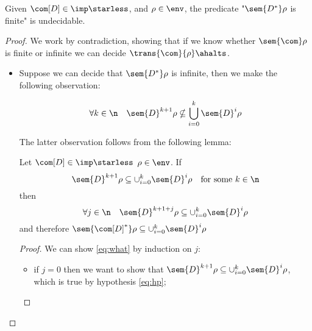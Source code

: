\begin{lemma}\label{le:infiniteness}
  Given \(\com[D]\in\imp\starless\), and \(\rho \in \env\), the
  predicate "\(\sem{D^*}\rho\) is finite" is undecidable.
\end{lemma}

\begin{proof}
  We work by contradiction, showing that if we know whether
  \(\sem{\com}\rho\) is finite or infinite we can decide
  \(\trans{\com}{\rho}\ahalts\).
  \begin{itemize}
  \item Suppose we can decide that \(\sem{D^*}\rho\) is infinite, then
    we make the following observation:
    \begin{observation}\label{obs:noncontained}
      \begin{equation*}
        \forall k \in \n \quad \sem{D}^{k+1}\rho \nsubseteq \bigcup_{i=0}^k\sem{D}^i\rho
      \end{equation*} 
    \end{observation}
    The latter observation follows from the following lemma:
    \begin{lemma}\label{le:contain}
      Let \(\com[D] \in \imp\starless\) \(\rho \in \env\). If
      \begin{equation}\label{eq:hp}
        \sem{D}^{k+1}\rho \subseteq \cup_{i=0}^k\sem{D}^i\rho \quad \text{for some } k \in \n
      \end{equation}
      then
      \begin{equation}\label{eq:what}
        \forall j \in \n \quad \sem{D}^{k+1+j}\rho \subseteq \cup_{i=0}^k\sem{D}^i\rho
      \end{equation}
      and therefore
      \(\sem{\com[D]^*}\rho \subseteq \cup_{i=0}^k\sem{D}^i\rho\)
    \end{lemma}
    \begin{proof}
      We can show \eqref{eq:what} by induction on \(j\):
      \begin{itemize}
      \item if \(j=0\) then we want to show that
        \(\sem{D}^{k+1}\rho \subseteq \cup_{i=0}^k\sem{D}^i\rho\), which is
        true by hypothesis \eqref{eq:hp};
        

\end{itemize}
\end{proof}
\end{itemize}
\end{proof}
